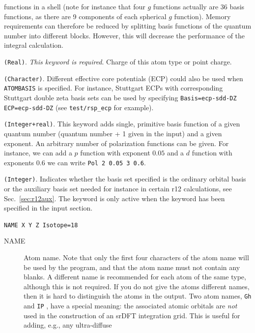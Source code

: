 \begin{description}
\begin{description}
functions in a shell (note for instance that four $g$ functions
actually are 36 basis functions,
as there are 9 components of each spherical $g$ function).
Memory requirements can therefore be reduced by splitting
basis functions of the quantum number into different blocks. However,
this will decrease the performance of the
integral calculation.
\item[Charge] \verb|(Real)|. {\em This keyword is required\/}.
  Charge of this atom type or point charge. 
\item[ECP] \verb|(Character)|.
  Different effective core potentials (ECP) could also be used when \verb|ATOMBASIS|
  is specified. For instance, Stuttgart ECPs with corresponding
  Stuttgart double zeta basis sets can be used by specifying
  \verb|Basis=ecp-sdd-DZ| \verb|ECP=ecp-sdd-DZ| (see \verb|test/rsp_ecp| for example).
\item[Pol] \verb|(Integer+real)|. This keyword adds single, primitive
  basis function of a given quantum number (quantum number + 1 given
  in the input) and a given exponent. An arbitrary number of
  polarization functions can be given. For instance, we can add a $p$
  function with exponent $0.05$ and a $d$ function with exponents
  $0.6$ we can write \verb|Pol 2 0.05 3 0.6|.
\item[Set] \verb|(Integer)|. Indicates whether the basis set specified
  is the ordinary orbital basis or the auxiliary basis set needed for
  instance in certain r12 calculations, see
  Sec.~\ref{sec:r12aux}. The keyword is only active when the keyword
   has been specified in the  input section.
\end{description}
\item[6] \verb|NAME X Y Z Isotope=18|
\begin{description}
\item[NAME] Atom name.
Note that only the first four characters of the atom name will be used by the program,
and that the atom name must not contain any blanks.
A different name is recommended for each atom of the same type, although this is not required.
If you do not give the atoms different names, then it is hard to distinguish the atoms in
the output.
Two atom names, \verb|Gh| and \verb|IP| , have a special meaning: the associated
atomic orbitals are \emph{not} used in the construction of
an srDFT integration grid. This is useful for adding, e.g., any ultra-diffuse

\end{description}
\end{description}

